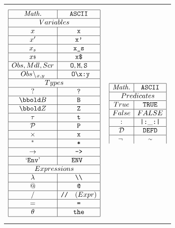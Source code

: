 \begin{center}
\begin{tabular}{p{2in}p{2in}}
$$
\begin{array}{|c|c|}
\hline   \emph{Math.} & \texttt{ASCII}
\\\hline \multicolumn{2}{|c|}{Variables}
\\\hline x            & \texttt{x}
\\\hline x'            & \texttt{x'}
\\\hline x_s            & \texttt{x\_s}
\\\hline \lst x       & \texttt{x\$}
\\\hline Obs, Mdl, Scr       & \texttt{O}, \texttt{M}, \texttt{S}
\\\hline Obs\less{x,y}  &\texttt{ O\BS x:y}
\\\hline \multicolumn{2}{|c|}{Types}
\\\hline ?          & \texttt{?}
\\\hline \Bool      & \texttt{B}
\\\hline \Int       & \texttt{Z}
\\\hline \tau       & \texttt{t}
\\\hline \power     & \texttt{P}
\\\hline \cross     & \texttt{x}
\\\hline {}^*       & \texttt{*}
\\\hline \fun       & \texttt{->}
\\\hline \litm{Env} & \texttt{ENV }
\\\hline \multicolumn{2}{|c|}{Expressions}
\\\hline \lambda & \texttt{\BS\BS}
\\\hline @       & \texttt{@}
\\\hline /       & \texttt{//}  \quad (Expr)
\\\hline =       & \texttt{=}
\\\hline \theta  & \texttt{the}
\\\hline
\end{array}
$$
&
$$
\begin{array}{|c|c|}
\hline   \emph{Math.} & \texttt{ASCII}
\\\hline \multicolumn{2}{|c|}{Predicates}
\\\hline True   & \texttt{TRUE}
\\\hline False  & FALSE
\\\hline :   &     \texttt{|:} \_ \texttt{:|}
\\\hline \mathcal D   & \texttt{DEFD}
\\\hline \lnot  &   \texttt{\TLD}

\end{array}$$
\end{tabular}
\end{center}
